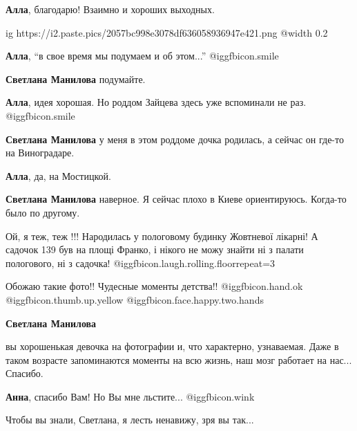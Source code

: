\begin{itemize}
\begin{itemize}
\begin{itemize}
\textbf{Алла}, благодарю! Взаимно и хороших выходных.


\ifcmt
  ig https://i2.paste.pics/2057bc998e3078df636058936947e421.png
  @width 0.2
\fi

\end{itemize} %

\textbf{Алла}, \enquote{в свое время мы подумаем и об этом...} @igg{fbicon.smile} 

\textbf{Светлана Манилова} подумайте.

\textbf{Алла}, идея хорошая. Но роддом Зайцева здесь уже вспоминали не раз. @igg{fbicon.smile} 

\begin{itemize} %
\textbf{Светлана Манилова} у меня в этом роддоме дочка родилась, а сейчас он где-то на Виноградаре.

\textbf{Алла}, да, на Мостицкой.

\textbf{Светлана Манилова} наверное. Я сейчас плохо в Киеве ориентируюсь. Когда-то было по другому.
\end{itemize} %


Ой, я теж, теж !!! Народилась у пологовому будинку Жовтневої лікарні! А садочок
139 був на площі Франко, і нікого не можу знайти ні з палати пологового, ні з
садочка! @igg{fbicon.laugh.rolling.floor}{repeat=3} 

\end{itemize} %


Обожаю такие фото!! Чудесные моменты детства!!  @igg{fbicon.hand.ok}
@igg{fbicon.thumb.up.yellow}  @igg{fbicon.face.happy.two.hands} 

\textbf{Светлана Манилова} 

вы хорошенькая девочка на фотографии и, что характерно, узнаваемая. Даже в
таком возрасте запоминаются моменты на всю жизнь, наш мозг работает на нас...
Спасибо.

\begin{itemize} %
\textbf{Анна}, спасибо Вам! Но Вы мне льстите... @igg{fbicon.wink} 

Чтобы вы знали, Светлана, я лесть ненавижу, зря вы так...


\end{itemize}
\end{itemize}
